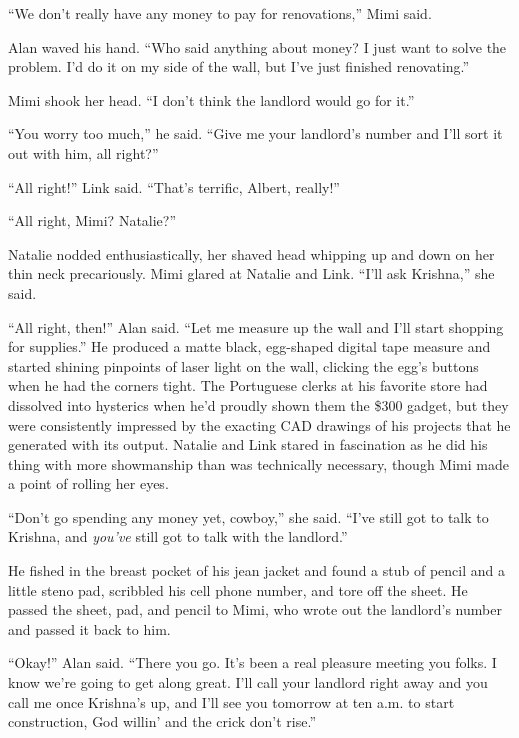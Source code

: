 \documentclass{article}
\begin{document}
``We don't really have any money to pay for renovations,'' Mimi said.

Alan waved his hand.  ``Who said anything about money?  I just want to
solve the problem.  I'd do it on my side of the wall, but I've just
finished renovating.''

Mimi shook her head.  ``I don't think the landlord would go for it.''

``You worry too much,'' he said.  ``Give me your landlord's number and
I'll sort it out with him, all right?''

``All right!'' Link said.  ``That's terrific, Albert, really!''

``All right, Mimi?  Natalie?''

Natalie nodded enthusiastically, her shaved head whipping up and down
on her thin neck precariously.  Mimi glared at Natalie and Link. 
``I'll ask Krishna,'' she said.

``All right, then!'' Alan said.  ``Let me measure up the wall and I'll
start shopping for supplies.'' He produced a matte black, egg-shaped
digital tape measure and started shining pinpoints of laser light on
the wall, clicking the egg's buttons when he had the corners tight. 
The Portuguese clerks at his favorite store had dissolved into
hysterics when he'd proudly shown them the \$300 gadget, but they were
consistently impressed by the exacting CAD drawings of his projects
that he generated with its output.  Natalie and Link stared in
fascination as he did his thing with more showmanship than was
technically necessary, though Mimi made a point of rolling her eyes.

``Don't go spending any money yet, cowboy,'' she said.  ``I've still
got to talk to Krishna, and \textit{you've} still got to talk with the
landlord.''

He fished in the breast pocket of his jean jacket and found a stub of
pencil and a little steno pad, scribbled his cell phone number, and
tore off the sheet.  He passed the sheet, pad, and pencil to Mimi, who
wrote out the landlord's number and passed it back to him.

``Okay!'' Alan said.  ``There you go.  It's been a real pleasure
meeting you folks.  I know we're going to get along great.  I'll call
your landlord right away and you call me once Krishna's up, and I'll
see you tomorrow at ten a.m.  to start construction, God willin' and
the crick don't rise.''
\end{document}
